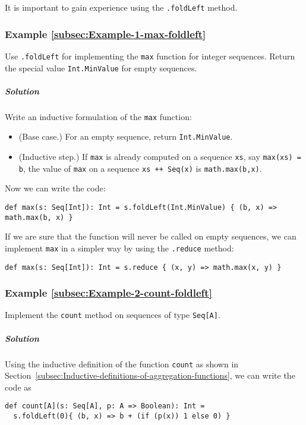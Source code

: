 It is important to gain experience using the \lstinline!.foldLeft!
method.

\subsubsection{Example \label{subsec:Example-1-max-foldleft}\ref{subsec:Example-1-max-foldleft}}

Use \lstinline!.foldLeft! for implementing the \lstinline!max! function
for integer sequences. Return the special value \lstinline!Int.MinValue!
for empty sequences.

\subparagraph{Solution}

Write an inductive formulation of the \lstinline!max! function:
\begin{itemize}
\item (Base case.) For an empty sequence, return \lstinline!Int.MinValue!.
\item (Inductive step.) If \lstinline!max! is already computed on a sequence
\lstinline!xs!, say \lstinline!max(xs) = b!, the value of \lstinline!max!
on a sequence \lstinline!xs ++ Seq(x)! is \lstinline!math.max(b,x)!. 
\end{itemize}
Now we can write the code:

\begin{lstlisting}
def max(s: Seq[Int]): Int = s.foldLeft(Int.MinValue) { (b, x) => math.max(b, x) }
\end{lstlisting}
If we are sure that the function will never be called on empty sequences,
we can implement \lstinline!max! in a simpler way by using the \lstinline!.reduce!
method:
\begin{lstlisting}
def max(s: Seq[Int]): Int = s.reduce { (x, y) => math.max(x, y) }
\end{lstlisting}


\subsubsection{Example \label{subsec:Example-2-count-foldleft}\ref{subsec:Example-2-count-foldleft}}

Implement the \lstinline!count! method on sequences of type \lstinline!Seq[A]!.

\subparagraph{Solution}

Using the inductive definition of the function \lstinline!count!
as shown in Section~\ref{subsec:Inductive-definitions-of-aggregation-functions},
we can write the code as

\begin{lstlisting}
def count[A](s: Seq[A], p: A => Boolean): Int =
  s.foldLeft(0){ (b, x) => b + (if (p(x)) 1 else 0) }
\end{lstlisting}


